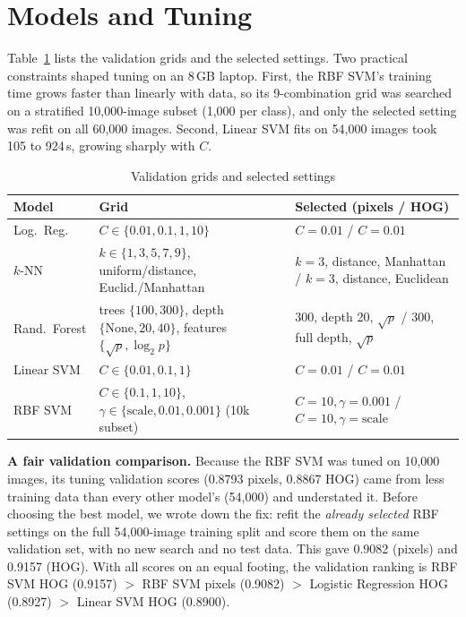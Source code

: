 \documentclass[conference]{IEEEtran}
\begin{document}
\section{Models and Tuning}
Table~\ref{tab:grids} lists the validation grids and the selected settings. Two practical constraints shaped tuning on an
8\,GB laptop. First, the RBF SVM's training time grows faster than linearly with data, so its 9-combination grid was
searched on a stratified 10,000-image subset (1,000 per class), and only the selected setting was refit on all 60,000
images. Second, Linear SVM fits on 54,000 images took 105 to 924\,s, growing sharply with $C$.

\begin{table}[t]
  \centering
  \caption{Validation grids and selected settings}
  \label{tab:grids}
  \setlength{\tabcolsep}{3pt}
  \begin{tabular}{p{1.45cm} p{3.05cm} p{2.9cm}}
    \toprule
    Model & Grid & Selected (pixels / HOG) \\
    \midrule
    Log.\ Reg. & $C\in\{0.01,0.1,1,10\}$ & $C=0.01$ / $C=0.01$ \\
    $k$-NN & $k\in\{1,3,5,7,9\}$, uniform/distance, Euclid./Manhattan & $k=3$, distance, Manhattan / $k=3$, distance, Euclidean \\
    Rand.\ Forest & trees $\{100,300\}$, depth $\{\text{None},20,40\}$, features $\{\sqrt{p},\log_2 p\}$ & 300, depth 20, $\sqrt{p}$ / 300, full depth, $\sqrt{p}$ \\
    Linear SVM & $C\in\{0.01,0.1,1\}$ & $C=0.01$ / $C=0.01$ \\
    RBF SVM & $C\in\{0.1,1,10\}$, $\gamma\in\{\text{scale},0.01,0.001\}$ (10k subset) & $C=10,\gamma=0.001$ / $C=10,\gamma=\text{scale}$ \\
    \bottomrule
  \end{tabular}
\end{table}

\textbf{A fair validation comparison.} Because the RBF SVM was tuned on 10,000 images, its tuning validation scores
(0.8793 pixels, 0.8867 HOG) came from less training data than every other model's (54,000) and understated it. Before
choosing the best model, we wrote down the fix: refit the \emph{already selected} RBF settings on the full 54,000-image
training split and score them on the same validation set, with no new search and no test data. This gave 0.9082 (pixels)
and 0.9157 (HOG). With all scores on an equal footing, the validation ranking is RBF SVM HOG (0.9157) $>$ RBF SVM pixels
(0.9082) $>$ Logistic Regression HOG (0.8927) $>$ Linear SVM HOG (0.8900).
\end{document}
